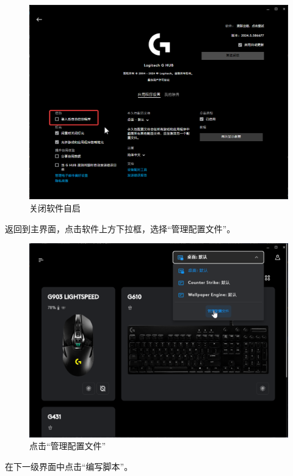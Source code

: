 \begin{figure}[H]
    \Centering
    \includegraphics[width=\textwidth]{docs/assets/disable_login_start.png}
    \caption{关闭软件自启}
\end{figure}

返回到主界面，点击软件上方下拉框，选择“管理配置文件”。

\begin{figure}[H]
    \Centering
    \includegraphics[width=\textwidth]{docs/assets/manage_configs.png}
    \caption{点击“管理配置文件”}
\end{figure}

在下一级界面中点击“编写脚本”。


